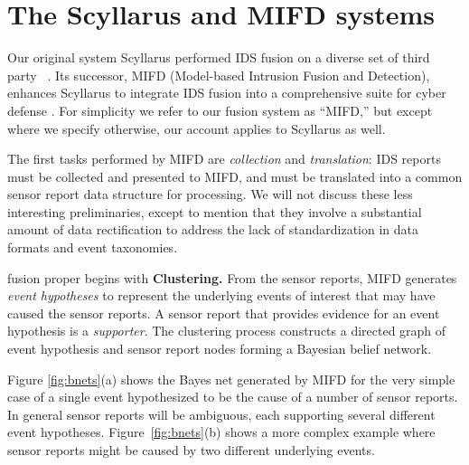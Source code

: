 \section{The Scyllarus and MIFD systems}
\label{sec:mifd}

Our original system Scyllarus
performed IDS
fusion on a diverse set of third party \idses~.
Its successor,
MIFD (Model-based Intrusion Fusion and Detection),
enhances Scyllarus
 to integrate
IDS fusion into a comprehensive suite for cyber defense
.
For simplicity we refer to our \ids fusion system as ``MIFD,'' but
except where we specify otherwise, our account applies to Scyllarus as well.

The first tasks performed by MIFD are
\emph{collection} and \emph{translation}: IDS reports
must be collected and presented to MIFD, and
must be translated into a common
sensor report data structure for processing.
We will not discuss these less interesting
preliminaries, except to mention that they
involve a substantial amount of data rectification
 to address the lack of standardization in data formats and event taxonomies.

{\ids} fusion proper begins with
\textbf{Clustering.} From the
sensor reports, MIFD generates \emph{event hypotheses} to represent the
underlying events of interest that may have caused the sensor reports.  A
sensor report that provides evidence for an event hypothesis is a
\emph{supporter}.
The clustering process constructs a
directed graph of event hypothesis and sensor report nodes forming a
Bayesian belief network.

Figure \ref{fig:bnets}(a) shows the Bayes net generated by MIFD for
the very simple case of a single event hypothesized to be the cause of
a number of sensor reports.  In general sensor reports will be
ambiguous, each supporting several different event hypotheses.
Figure~\ref{fig:bnets}(b) shows a more complex example where sensor reports
might be caused by two different underlying events.

